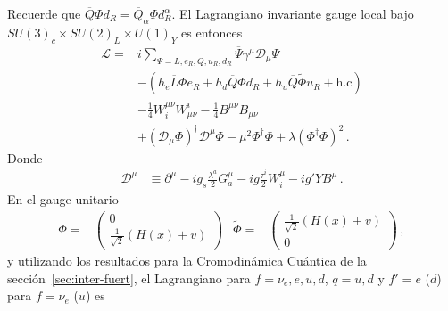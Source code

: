 Recuerde que $\overline{Q}\Phi d_R=\overline{Q}_\alpha\Phi d_R^\alpha$.
El Lagrangiano invariante gauge local bajo $SU(3)_c\times SU(2)_L\times U(1)_Y$ es entonces
\begin{align}
     \mathcal{L}=&i\sum_{\Psi=L,e_R,Q,u_R,d_R}\overline{\Psi}\gamma^\mu\mathcal{D}_\mu \Psi\nonumber\\
     &-(h_e\overline{L}\Phi e_R+h_d\overline{Q}\Phi d_R+h_u\overline{Q}\widetilde{\Phi}u_R+\text{h.c})\nonumber\\
     &-\tfrac{1}{4}W^{\mu\nu}_i W_{\mu\nu}^i-\tfrac{1}{4}B^{\mu\nu} B_{\mu\nu}\nonumber\\
     &+(\mathcal{D}_\mu\Phi)^\dagger\mathcal{D}^\mu\Phi-\mu^2\Phi^\dagger\Phi+\lambda(\Phi^\dagger\Phi)^2\,.
\end{align}
Donde
\begin{align}
  \mathcal{D}^\mu&\equiv\partial^\mu-i g_s\frac{\lambda^a}{2}G^\mu_a-i g \frac{\tau^i}{2}W^\mu_i-i g'YB^\mu\,.
\end{align}
En el gauge unitario
\begin{align}
  \Phi=&\begin{pmatrix}
    0\\
    \frac{1}{\sqrt{2}}(H(x)+v)
  \end{pmatrix}&  \widetilde{\Phi}=&\begin{pmatrix}
    \frac{1}{\sqrt{2}}(H(x)+v)\\
    0
  \end{pmatrix}\,,
\end{align}
y utilizando los resultados para la Cromodin\'amica Cu\'antica de la secci\'on~\ref{sec:inter-fuert}, el Lagrangiano para $f=\nu_e,e,u,d$, $q=u,d$ y $f'=e$ ($d$) para $f=\nu_e$ ($u$) es
